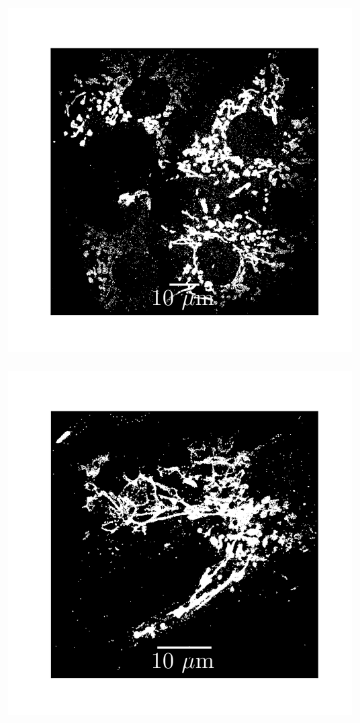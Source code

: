 \begin{figure}
\begin{subfigure}{0.32\textwidth}
        \caption{}
    \end{subfigure}
    \begin{subfigure}{0.32\textwidth}
        \includegraphics[width=\textwidth]{figures/mitochondria_image11.png}
        \caption{}
    \end{subfigure}
    \begin{subfigure}{0.32\textwidth}
        \includegraphics[width=\textwidth]{figures/mitochondria_image9.png}

\end{subfigure}
\end{figure}
